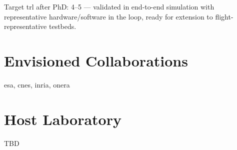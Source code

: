 \documentclass[12pt]{article}
\begin{document}
	Target \acrshort{trl} after PhD: 4–5 — validated in end-to-end simulation with representative hardware/software in the loop, ready for extension to flight-representative testbeds.
	
	
	
	\nocite{*}
	
	\printbibliography[title=Indicative Bibliography]
	
	\section*{Envisioned Collaborations}
	
	\acrshort{esa}, \acrshort{cnes}, \acrshort{inria}, \acrshort{onera}
	
	\section*{Host Laboratory}
	
	TBD
	
	\printglossaries
	
\end{document}
